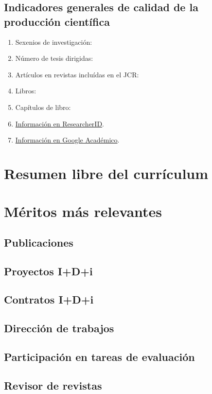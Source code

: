 \documentclass[a4paper]{article}
\begin{document}
\subsection{Indicadores generales de calidad de la producción científica}

\begin{enumerate}
\item Sexenios de investigación: 
\item Número de tesis dirigidas: 
\item Artículos en revistas incluídas en el JCR: 
\item Libros: 
\item Capítulos de libro: 
\item \href{http://www.researcherid.com/rid/\ResearcherID}{Información en ResearcherID}.
\item \href{https://scholar.google.es/citations?hl=es&user=\GoogleUser}{Información en Google Académico}.
\end{enumerate}

\section{Resumen libre del currículum}

  
\section{Méritos más relevantes}

\subsection{Publicaciones}


\subsection{Proyectos I+D+i}


\subsection{Contratos I+D+i}



\subsection{Dirección de trabajos}


\subsection{Participación en tareas de evaluación}


\subsection{Revisor de revistas}

\end{document}
